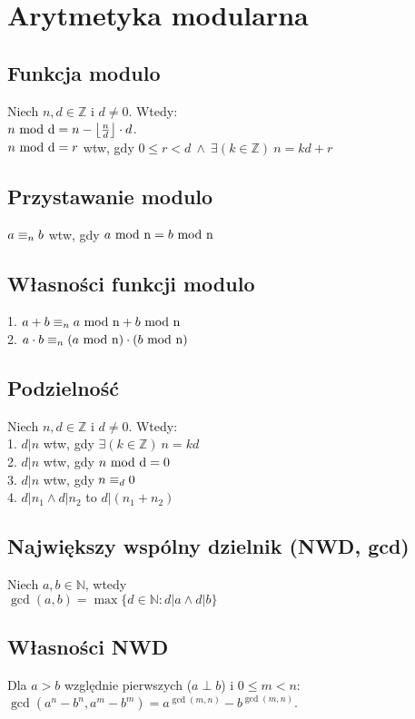 \section{Arytmetyka modularna}

\subsection*{Funkcja modulo}
Niech $n, d \in \mathbb{Z}$ i $d \neq 0$. Wtedy: \\
$n \ \mathrm{mod\ d} = n - \left\lfloor \frac{n}{d} \right\rfloor \cdot d$. \\

$n \ \mathrm{mod\ d} = r$ wtw, gdy ${0 \leq r < d} \ \wedge \ {\exists (k \in \mathbb{Z})} \ {n = kd + r}$

\subsection*{Przystawanie modulo}
$a \equiv_{n} b$ wtw, gdy $a \ \mathrm{mod\ n} = b \ \mathrm{mod\ n}$

\subsection*{Własności funkcji modulo}
1. $a + b \equiv_{n} a \ \mathrm{mod\ n} + b \ \mathrm{mod\ n}$ \\
2. $a \cdot b \equiv_{n} (a \ \mathrm{mod\ n}) \cdot (b \ \mathrm{mod\ n})$

\subsection*{Podzielność}
Niech $n, d \in \mathbb{Z}$ i $d \neq 0$. Wtedy: \\
1. $d | n$ wtw, gdy $\exists (k \in \mathbb{Z}) \ n = kd$ \\
2. $d | n$ wtw, gdy $n \ \mathrm{mod\ d} = 0$ \\
3. $d | n$ wtw, gdy $n \equiv_{d} 0$ \\
4. $d | n_1 \wedge d | n_2$ to $d | (n_1 + n_2)$

\subsection*{Największy wspólny dzielnik (NWD, gcd)}
Niech $a, b \in \mathbb{N}$, wtedy \\
$\gcd(a,b) = \max \{ d \in \mathbb{N} : d|a \wedge d|b \}$

\subsection*{Własności NWD}
Dla $a > b$ względnie pierwszych ($a \perp b$) i $0 \leq m < n$: \\
$\gcd(a^n - b^n, a^m - b^m) = a^{\gcd(m,n)} - b^{\gcd(m,n)}$.

